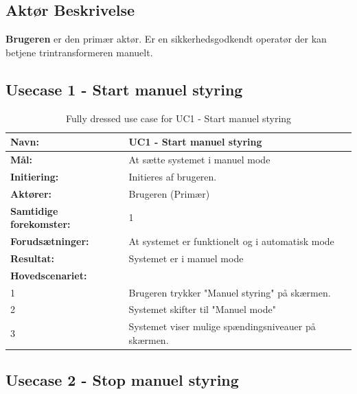 \subsection{Aktør Beskrivelse}
\textbf{Brugeren} er den primær aktør. Er en sikkerhedsgodkendt operatør der kan betjene trintransformeren manuelt.

\subsection{Usecase 1 - Start manuel styring}
\begin{table}[H]
	\centering
	
	\begin{threeparttable}
		\begin{tabularx}{\linewidth}{ l X }
			\toprule
			\bfseries{Navn:}				& UC1 - Start manuel styring  \\
			\midrule
			\bfseries{Mål:} 				& At sætte systemet i manuel mode \\
			\midrule
			\bfseries{Initiering:} 			& Initieres af brugeren. \\
			\midrule
			\bfseries{Aktører:} 			& Brugeren (Primær) \\
			\midrule
			\bfseries{Samtidige forekomster:} & 1 \\
			\midrule
			\bfseries{Forudsætninger:} 		& At systemet er funktionelt og i automatisk mode\\
			\midrule
			\bfseries{Resultat:} 			& Systemet er i manuel mode \\
			\midrule
			\bfseries{Hovedscenariet:} 	& \\
			
			
			1 	& Brugeren trykker "Manuel styring" på skærmen.\\
			2	& Systemet skifter til "Manuel mode" \\
			3 	& Systemet viser mulige spændingsniveauer på skærmen. 	\\
			
			\bottomrule
			
		\end{tabularx}
	\end{threeparttable}
	\caption{Fully dressed use case for UC1 - Start manuel styring}
	\label{table:UC1}
\end{table}

\subsection{Usecase 2 - Stop manuel styring}

